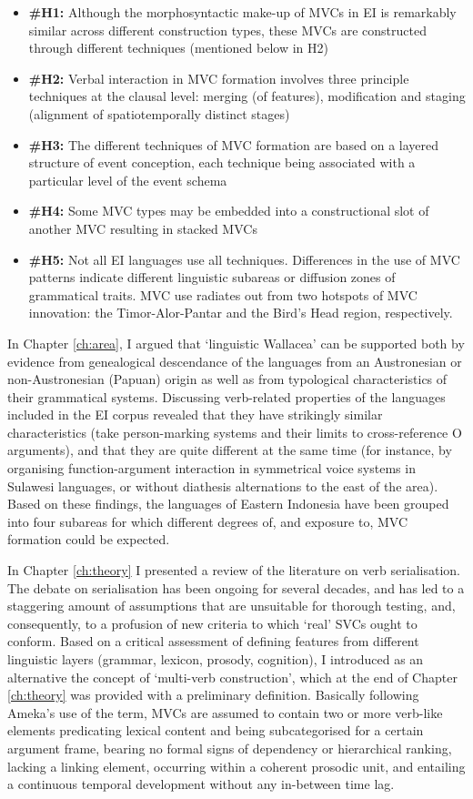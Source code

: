 \begin{itemize}
\item \textbf{\#H1:} Although the morphosyntactic make-up of MVCs in EI is remarkably similar across different construction types, these MVCs are constructed through different techniques (mentioned below in H2)
\item \textbf{\#H2:} Verbal interaction in MVC formation involves three principle techniques at the clausal level: merging (of features), modification and staging (alignment of spatiotemporally distinct stages)
\item \textbf{\#H3:} The different techniques of MVC formation are based on a layered structure of event conception, each technique being associated with a particular level of the event schema
\item \textbf{\#H4:} Some MVC types may be embedded into a constructional slot of another MVC resulting in stacked MVCs
\item \textbf{\#H5:} Not all EI languages use all techniques. Differences in the use of MVC patterns indicate different linguistic subareas or diffusion zones of grammatical traits. MVC use radiates out from two hotspots of MVC innovation: the Timor-Alor-Pantar and the Bird's Head region, respectively.
\end{itemize}

In Chapter \ref{ch:area}, I argued that `linguistic Wallacea' can be supported both by evidence from genealogical descendance of the languages from an Austronesian or non-Austronesian (Papuan) origin as well as from typological characteristics of their grammatical systems. Discussing verb-related properties of the languages included in the EI corpus revealed that they have strikingly similar characteristics (take person-marking systems and their limits to cross-reference O arguments), and that they are quite different at the same time (for instance, by organising function-argument interaction in symmetrical voice systems in Sulawesi languages, or without diathesis alternations to the east of the area). Based on these findings, the languages of Eastern Indonesia have been grouped into four subareas for which different degrees of, and exposure to, MVC formation could be expected. 

In Chapter \ref{ch:theory} I presented a review of the literature on verb serialisation. The debate on serialisation has been ongoing for several decades, and has led to a staggering amount of assumptions that are unsuitable for thorough testing, and, consequently, to a profusion of new criteria to which `real' SVCs ought to conform. Based on a critical assessment of defining features from different linguistic layers (grammar, lexicon, prosody, cognition), I introduced as an alternative the concept of `multi-verb construction', which at the end of Chapter \ref{ch:theory} was provided with a preliminary definition. Basically following Ameka's use of the term, MVCs are assumed to contain two or more verb-like elements predicating lexical content and being subcategorised for a certain argument frame, bearing no formal signs of dependency or hierarchical ranking, lacking a linking element, occurring within a coherent prosodic unit, and entailing a continuous temporal development without any in-between time lag. 

